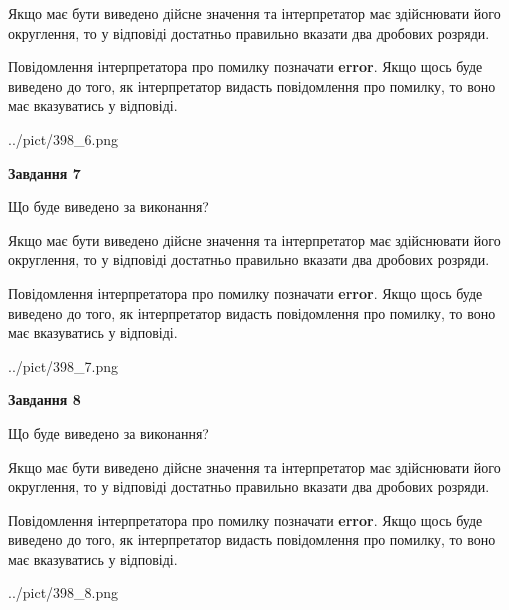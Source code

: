 \documentclass[12pt, ukrainian]{article}
\begin{document}
{\begin {Large}
Якщо має бути виведено дійсне значення та інтерпретатор має здійснювати його округлення, 
то у відповіді достатньо правильно вказати два дробових розряди.

Повідомлення інтерпретатора про помилку позначати \textbf{error}.
Якщо щось буде виведено до того, як інтерпретатор видасть повідомлення про помилку, 
то воно має вказуватись у відповіді. \par

\begin{center}
	{../pict/398_6.png}
\end{center}
\newpage

{\begin {center}\textbf{Завдання 7}\end {center}}\par
Що буде виведено за виконання? \par

Якщо має бути виведено дійсне значення та інтерпретатор має здійснювати його округлення, 
то у відповіді достатньо правильно вказати два дробових розряди.

Повідомлення інтерпретатора про помилку позначати \textbf{error}.
Якщо щось буде виведено до того, як інтерпретатор видасть повідомлення про помилку, 
то воно має вказуватись у відповіді. \par

\begin{center}
	{../pict/398_7.png}
\end{center}
\newpage

{\begin {center}\textbf{Завдання 8}\end {center}}\par
Що буде виведено за виконання? \par

Якщо має бути виведено дійсне значення та інтерпретатор має здійснювати його округлення, 
то у відповіді достатньо правильно вказати два дробових розряди.

Повідомлення інтерпретатора про помилку позначати \textbf{error}.
Якщо щось буде виведено до того, як інтерпретатор видасть повідомлення про помилку, 
то воно має вказуватись у відповіді. \par

\begin{center}
	{../pict/398_8.png}
\end{center}
\newpage


\end{Large}}
\end{document}

